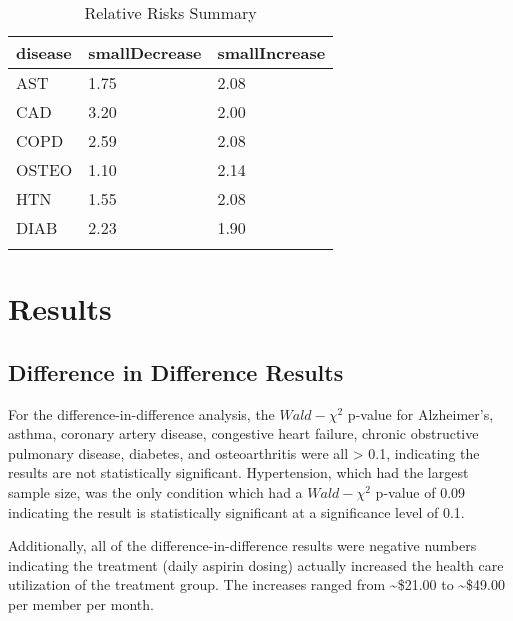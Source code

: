 \documentclass[
  english,
  man]{apa6}
\begin{document}
\begin{table}[tbp]

\begin{center}
\begin{threeparttable}

\caption{\label{tab:oddsTable}Relative Risks Summary}

\begin{tabular}{lll}
\toprule{}
disease & \multicolumn{1}{c}{smallDecrease} & \multicolumn{1}{c}{smallIncrease}\\
\midrule{}
AST & 1.75 & 2.08\\
CAD & 3.20 & 2.00\\
COPD & 2.59 & 2.08\\
OSTEO & 1.10 & 2.14\\
HTN & 1.55 & 2.08\\
DIAB & 2.23 & 1.90\\
\bottomrule{}
\end{tabular}

\end{threeparttable}
\end{center}

\end{table}

\hypertarget{results}{%
\section{Results}\label{results}}

\hypertarget{difference-in-difference-results}{%
\subsection{Difference in Difference Results}\label{difference-in-difference-results}}

For the difference-in-difference analysis, the \(Wald-\chi^2\) p-value for Alzheimer's, asthma, coronary artery disease, congestive heart failure, chronic obstructive pulmonary disease, diabetes, and osteoarthritis were all \textgreater{} 0.1, indicating the results are not statistically significant. Hypertension, which had the largest sample size, was the only condition which had a \(Wald-\chi^2\) p-value of 0.09 indicating the result is statistically significant at a significance level of 0.1.

Additionally, all of the difference-in-difference results were negative numbers indicating the treatment (daily aspirin dosing) actually increased the health care utilization of the treatment group. The increases ranged from \textasciitilde\$21.00 to \textasciitilde\$49.00 per member per month.
\end{document}
